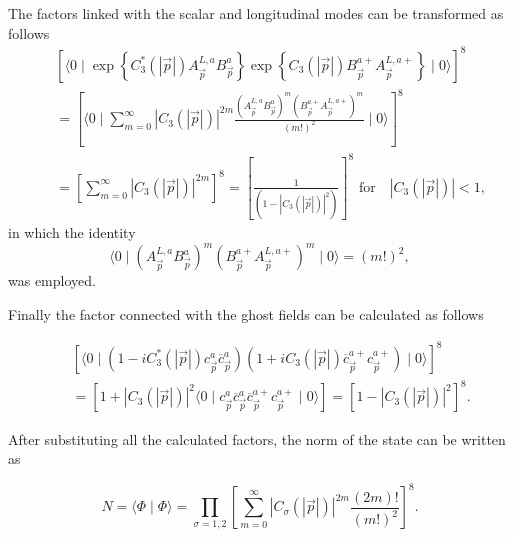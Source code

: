 \documentclass[12pt,letterpaper]{report}
\begin{document}
The factors linked with the scalar and longitudinal modes can be
transformed as follows
\begin{eqnarray}
&&\left[ \langle 0\mid \exp \left\{ C_3^{*}\left(\left|
\vec{p}\right| \right) A_{\vec{p}}^{L,a}B_{\vec{p}}^a\right\} \exp
\left\{ C_3\left(\left| \vec{p}\right| \right)
B_{\vec{p}}^{a+}A_{\vec{p}}^{L,a+}\right\} \mid 0\rangle \right]
^8 \nonumber \\ &&=\left[ \langle 0\mid \sum\limits_{m=0}^\infty
\left| C_3\left(\left| \vec{p}\right| \right) \right|
^{2m}\frac{\left(A_{\vec{p}}^{L,a}B_{\vec{p} }^a\right) ^m\left(
B_{\vec{p}}^{a+}A_{\vec{p}}^{L,a+}\right) ^m}{\left(m!\right)
^2}\mid 0\rangle \right] ^8 \nonumber \\ &&=\left[
\sum\limits_{m=0}^\infty \left| C_3\left(\left| \vec{p}\right|
\right) \right| ^{2m}\right] ^8=\left[ \frac 1{\left(1-\left|
C_3\left(\left| \vec{p}\right| \right) \right| ^2\right) }\right]
^8\text{ for}\quad \left| C_3\left(\left| \vec{p}\right| \right)
\right| <1, \label{normLS}
\end{eqnarray}
\noindent in which the identity
\[
\langle 0\mid \left(A_{\vec{p}}^{L,a}B_{\vec{p}}^a\right) ^m\left(
B_{\vec{p }}^{a+}A_{\vec{p}}^{L,a+}\right) ^m\mid 0\rangle =\left(
m!\right) ^2,
\]
was employed.

Finally the factor connected with the ghost fields can be
calculated as follows

\begin{eqnarray}
&&\left[ \langle 0\mid \left(1-iC_3^{*}\left(\left| \vec{p}\right|
\right) c_{\vec{p}}^a\overline{c}_{\vec{p}}^a\right) \left(
1+iC_3\left(\left| \vec{ p}\right| \right)
\overline{c}_{\vec{p}}^{a+}c_{\vec{p}}^{a+}\right) \mid 0\rangle
\right] ^8 \nonumber \\ &&=\left[ 1+\left| C_3\left(\left|
\vec{p}\right| \right) \right| ^2\langle 0\mid
c_{\vec{p}}^a\overline{c}_{\vec{p}}^a\overline{c}_{\vec{p}}^{a+}c_{
\vec{p}}^{a+}\mid 0\rangle \right] =\left[ 1-\left| C_3\left(
\left| \vec{p} \right| \right) \right| ^2\right] ^8. \label{normG}
\end{eqnarray}

After substituting all the calculated factors, the norm of the
state can be written as

\begin{equation}
N=\langle \Phi \mid \Phi \rangle =\prod\limits_{\sigma =1,2}\left[
\sum\limits_{m=0}^\infty \left| C_\sigma \left(\left|
\vec{p}\right| \right) \right| ^{2m}\frac{\left(2m\right)
!}{\left(m!\right) ^2}\right] ^8.
\end{equation}
\end{document}

